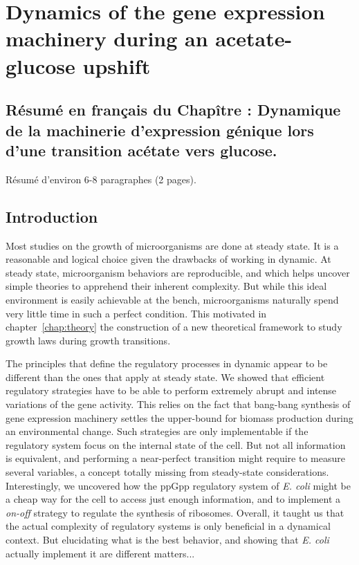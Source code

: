 \chapter{Dynamics of the gene expression machinery during an acetate-glucose upshift}
\label{chap:experiments}


\section*{Résumé en français du Chapître \thechapter : Dynamique de la machinerie d'expression génique lors d'une transition acétate vers glucose.}

Résumé d'environ 6-8 paragraphes (2 pages).

\section{Introduction}

Most studies on the growth of microorganisms are done at steady state.
It is a reasonable and logical choice given the drawbacks of working in dynamic.
At steady state, microorganism behaviors are reproducible, and which helps uncover simple theories to apprehend their inherent complexity.
But while this ideal environment is easily achievable at the bench, microorganisms naturally spend very little time in such a perfect condition.
This motivated in chapter~\ref{chap:theory} the construction of a new theoretical framework to study growth laws during growth transitions.

The principles that define the regulatory processes in dynamic appear to be different than the ones that apply at steady state.
We showed that efficient regulatory strategies have to be able to perform extremely abrupt and intense variations of the gene activity.
This relies on the fact that bang-bang synthesis of gene expression machinery settles the upper-bound for biomass production during an environmental change.
Such strategies are only implementable if the regulatory system focus on the internal state of the cell.
But not all information is equivalent, and performing a near-perfect transition might require to measure several variables, a concept totally missing from steady-state considerations.
Interestingly, we uncovered how the ppGpp regulatory system of \textit{E. coli} might be a cheap way for the cell to access just enough information, and to implement a \textit{on-off} strategy to regulate the synthesis of ribosomes.
Overall, it taught us that the actual complexity of regulatory systems is only beneficial in a dynamical context.
But elucidating what is the best behavior, and showing that \textit{E. coli} actually implement it are different matters...

